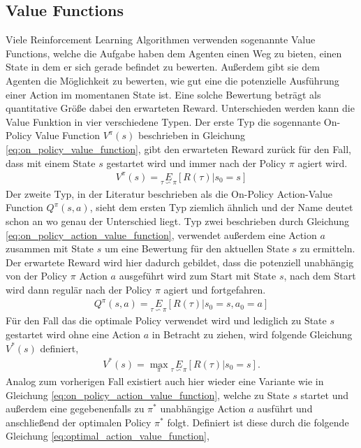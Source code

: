 \documentclass[]{iat}
\begin{document}
\subsection{Value Functions}
Viele Reinforcement Learning Algorithmen verwenden sogenannte Value Functions, welche die Aufgabe haben dem Agenten einen Weg zu bieten, einen State in dem er sich gerade befindet zu bewerten. Außerdem gibt sie dem Agenten die Möglichkeit zu bewerten, wie gut eine die potenzielle Ausführung einer Action im momentanen State ist. Eine solche Bewertung beträgt als quantitative Größe dabei den erwarteten Reward. Unterschieden werden kann die Value Funktion in vier verschiedene Typen. Der erste Typ die sogennante On-Policy Value Function $V^{\pi}(s)$ beschrieben in Gleichung \ref{eq:on_policy_value_function}, gibt den erwarteten Reward zurück für den Fall, dass mit einem State $s$ gestartet wird und immer nach der Policy $\pi$ agiert wird.
\begin{align}
    V^{\pi}(s) = \underset{\tau \backsim \pi}{E}\left[R(\tau)|s_0 = s\right] \label{eq:on_policy_value_function}
\end{align}
Der zweite Typ, in der Literatur beschrieben als die On-Policy Action-Value Function $Q^{\pi}(s,a)$, sieht dem ersten Typ ziemlich ähnlich und der Name deutet schon an wo genau der Unterschied liegt. Typ zwei beschrieben durch Gleichung \ref{eq:on_policy_action_value_function}, verwendet außerdem eine Action $a$ zusammen mit State $s$ um eine Bewertung für den aktuellen State $s$ zu ermitteln. Der erwartete Reward wird hier dadurch gebildet, dass die potenziell unabhängig von der Policy $\pi$ Action $a$ ausgeführt wird zum Start mit State $s$, nach dem Start wird dann regulär nach der Policy $\pi$ agiert und fortgefahren.
\begin{align}
    Q^{\pi}(s,a) = \underset{\tau \backsim \pi}{E}\left[R(\tau)|s_0 = s, a_0 = a\right] \label{eq:on_policy_action_value_function}
\end{align}
Für den Fall das die optimale Policy verwendet wird und lediglich zu State $s$ gestartet wird ohne eine Action $a$ in Betracht zu ziehen, wird folgende Gleichung $V^*(s)$ definiert,
\begin{align}
    V^{*}(s) = \underset{\pi}{\max}\underset{\tau \backsim \pi}{E}\left[R(\tau)|s_0 = s\right]. \label{eq:optimal_value_function}
\end{align}
Analog zum vorherigen Fall existiert auch hier wieder eine Variante wie in Gleichung \ref{eq:on_policy_action_value_function}, welche zu State $s$ startet und außerdem eine gegebenenfalls zu $\pi^*$ unabhängige Action $a$ ausführt und anschließend der optimalen Policy $\pi^*$ folgt. Definiert ist diese durch die folgende Gleichung \ref{eq:optimal_action_value_function},
\end{document}
